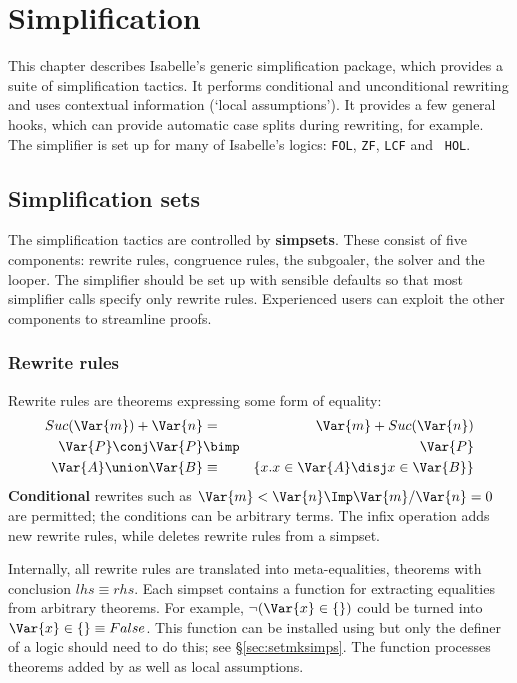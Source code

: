 \chapter{Simplification} \label{simp-chap}

This chapter describes Isabelle's generic simplification package, which
provides a suite of simplification tactics.  It performs conditional and
unconditional rewriting and uses contextual information (`local
assumptions').  It provides a few general hooks, which can provide
automatic case splits during rewriting, for example.  The simplifier is set
up for many of Isabelle's logics: {\tt FOL}, {\tt ZF}, {\tt LCF} and {\tt
  HOL}.


\section{Simplification sets} 
The simplification tactics are controlled by {\bf simpsets}.  These consist
of five components: rewrite rules, congruence rules, the subgoaler, the
solver and the looper.  The simplifier should be set up with sensible
defaults so that most simplifier calls specify only rewrite rules.
Experienced users can exploit the other components to streamline proofs.


\subsection{Rewrite rules}
Rewrite rules are theorems expressing some form of equality:
\begin{eqnarray*}
  Suc(\Var{m}) + \Var{n} &=&      \Var{m} + Suc(\Var{n}) \\
  \Var{P}\conj\Var{P}    &\bimp&  \Var{P} \\
  \Var{A} \union \Var{B} &\equiv& \{x.x\in \Var{A} \disj x\in \Var{B}\}
\end{eqnarray*}
{\bf Conditional} rewrites such as $\Var{m}<\Var{n} \Imp \Var{m}/\Var{n} =
0$ are permitted; the conditions can be arbitrary terms.  The infix
operation  adds new rewrite rules, while
 deletes rewrite rules from a simpset.

Internally, all rewrite rules are translated into meta-equalities, theorems
with conclusion $lhs \equiv rhs$.  Each simpset contains a function for
extracting equalities from arbitrary theorems.  For example,
$\neg(\Var{x}\in \{\})$ could be turned into $\Var{x}\in \{\} \equiv
False$.  This function can be installed using  but only
the definer of a logic should need to do this; see \S\ref{sec:setmksimps}.
The function processes theorems added by  as well as
local assumptions.


